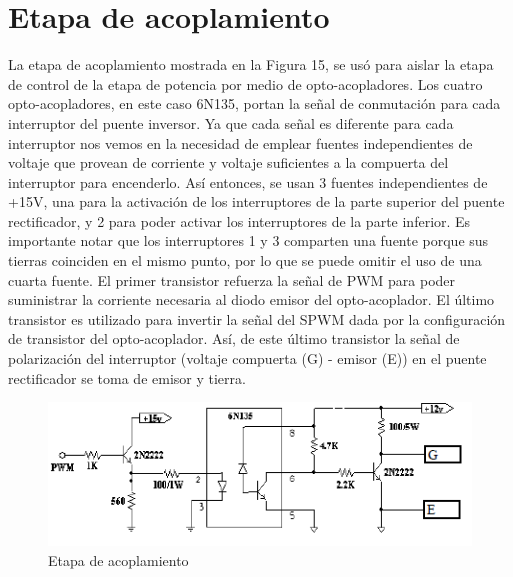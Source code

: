 \documentclass[12pt,a4paper]{article}
\begin{document}
\section{Etapa de acoplamiento}
La etapa de acoplamiento mostrada en la Figura 15, se usó para aislar la etapa de control de la etapa de potencia por medio de opto-acopladores. Los cuatro opto-acopladores, en este caso 6N135, portan la señal de conmutación para cada interruptor del puente inversor. Ya que cada señal es diferente para cada interruptor nos vemos en la necesidad de emplear
fuentes independientes de voltaje que provean de corriente y voltaje suficientes a la compuerta del interruptor para encenderlo. Así entonces, se usan 3 fuentes independientes de +15V, una para la activación de los interruptores de la parte superior del puente rectificador, y 2 para poder activar los interruptores de la parte inferior. Es importante notar que los
interruptores 1 y 3 comparten una fuente porque sus tierras coinciden en el mismo punto, por lo que se puede omitir el uso de una cuarta fuente. El primer transistor refuerza la señal de PWM para poder suministrar la corriente necesaria al diodo emisor del opto-acoplador. El último transistor es utilizado para invertir la señal del SPWM dada
por la configuración de transistor del opto-acoplador. Así, de este último transistor la señal de polarización del interruptor (voltaje compuerta (G) - emisor (E)) en el puente rectificador se toma de emisor y tierra.
\begin{figure}[hbtp]
\centering
\includegraphics[scale=0.67]{Pictures/C.PNG}
\caption{Etapa de acoplamiento}
\end{figure}
\end{document}
